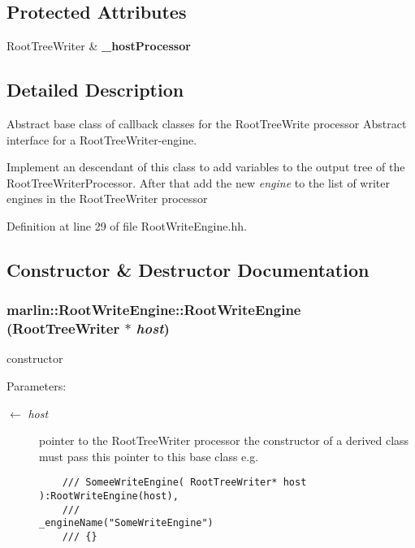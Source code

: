 \subsection*{Protected Attributes}
\begin{CompactItemize}
\item 
Root\-Tree\-Writer \& \bf{\_\-host\-Processor}\label{classmarlin_1_1RootWriteEngine_06de7544ff28c539d38a40ac05495862}

\end{CompactItemize}


\subsection{Detailed Description}
Abstract base class of callback classes for the Root\-Tree\-Write processor Abstract interface for a Root\-Tree\-Writer-engine. 

Implement an descendant of this class to add variables to the output tree of the Root\-Tree\-Writer\-Processor. After that add the new {\em engine\/} to the list of writer engines in the Root\-Tree\-Writer processor 



Definition at line 29 of file Root\-Write\-Engine.hh.

\subsection{Constructor \& Destructor Documentation}
\subsubsection{\setlength{\rightskip}{0pt plus 5cm}marlin::Root\-Write\-Engine::Root\-Write\-Engine (Root\-Tree\-Writer $\ast$ {\em host})\hspace{0.3cm}{\tt  [inline]}}\label{classmarlin_1_1RootWriteEngine_b9551f5a3323b6489adb42a7993ebb6f}


constructor 

\begin{Desc}
\item[Parameters:]
\begin{description}
\item[\mbox{$\leftarrow$} {\em host}]pointer to the Root\-Tree\-Writer processor the constructor of a derived class must pass this pointer to this base class e.g.

\footnotesize\begin{verbatim}    /// SomeeWriteEngine( RootTreeWriter* host ):RootWriteEngine(host),
    ///                                          _engineName("SomeWriteEngine")
    /// {} \end{verbatim}
\normalsize
 \end{description}
\end{Desc}


